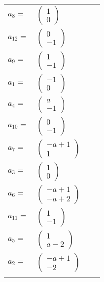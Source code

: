 \documentclass[1p]{elsarticle_modified}
\theoremstyle{definition}
\begin{document}
\begin{tabular}{m{7pt} m{180pt} m{7pt} m{180pt} }
\flushright $a_{8}=$&$\begin{pmatrix}1\\0\end{pmatrix}$ \\
\flushright $a_{12}=$&$\begin{pmatrix}0\\-1\end{pmatrix}$ \\
\flushright $a_{9}=$&$\begin{pmatrix}1\\-1\end{pmatrix}$ \\
\flushright $a_{1}=$&$\begin{pmatrix}-1\\0\end{pmatrix}$ \\
\flushright $a_{4}=$&$\begin{pmatrix}a\\-1\end{pmatrix}$ \\
\flushright $a_{10}=$&$\begin{pmatrix}0\\-1\end{pmatrix}$ \\
\flushright $a_{7}=$&$\begin{pmatrix}- a+1\\1\end{pmatrix}$ \\
\flushright $a_{3}=$&$\begin{pmatrix}1\\0\end{pmatrix}$ \\
\flushright $a_{6}=$&$\begin{pmatrix}- a+1\\- a+2\end{pmatrix}$ \\
\flushright $a_{11}=$&$\begin{pmatrix}1\\-1\end{pmatrix}$ \\
\flushright $a_{5}=$&$\begin{pmatrix}1\\a-2\end{pmatrix}$ \\
\flushright $a_{2}=$&$\begin{pmatrix}- a+1\\-2\end{pmatrix}$\\&\end{tabular}
\end{document}
